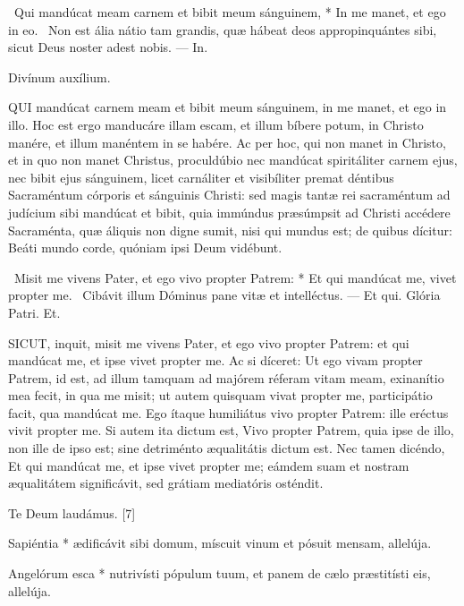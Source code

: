 \R\ Qui mandúcat meam carnem et bibit meum sánguinem, * In me manet, et ego in eo. \V\ Non est ália nátio tam grandis, quæ hábeat deos appropinquántes sibi, sicut Deus noster adest nobis. --- In.

 Divínum auxílium.


\lettrine[lines=2]{Q}{UI} mandúcat carnem meam et bibit meum sánguinem, in me manet, et ego in illo. Hoc est ergo manducáre illam escam, et illum bíbere potum, in Christo manére, et illum manéntem in se habére. Ac per hoc, qui non manet in Christo, et in quo non manet Christus, proculdúbio nec mandúcat spiritáliter carnem ejus, nec bibit ejus sánguinem, licet carnáliter et visibíliter premat déntibus Sacraméntum córporis et sánguinis Christi: sed magis tantæ rei sacraméntum ad judícium sibi mandúcat et bibit, quia immúndus præsúmpsit ad Christi accédere Sacraménta, quæ áliquis non digne sumit, nisi qui mundus est; de quibus dícitur: Beáti mundo corde, quóniam ipsi Deum vidébunt.

\R\ Misit me vivens Pater, et ego vivo propter Patrem: * Et qui mandúcat me, vivet propter me. \V\ Cibávit illum Dóminus pane vitæ et intelléctus. --- Et qui. Glória Patri. Et.


\lettrine[lines=2]{S}{ICUT}, inquit, misit me vivens Pater, et ego vivo propter Patrem: et qui mandúcat me, et ipse vivet propter me. Ac si díceret: Ut ego vivam propter Patrem, id est, ad illum tamquam ad majórem réferam vitam meam, exinanítio mea fecit, in qua me misit; ut autem quisquam vivat propter me, participátio facit, qua mandúcat me. Ego ítaque humiliátus vivo propter Patrem: ille eréctus vivit propter me. Si autem ita dictum est, Vivo propter Patrem, quia ipse de illo, non ille de ipso est; sine detriménto æqualitátis dictum est. Nec tamen dicéndo, Et qui mandúcat me, et ipse vivet propter me; eámdem suam et nostram æqualitátem significávit, sed grátiam mediatóris osténdit.

Te Deum laudámus. [7]


 Sapiéntia * ædificávit sibi domum, míscuit vinum et pósuit mensam, allelúja.


 Angelórum esca * nutrivísti pópulum tuum, et panem de cælo præstitísti eis, allelúja.

